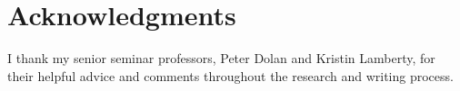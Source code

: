 \documentclass{sig-alternate}
\begin{document}
\section*{Acknowledgments}
\label{sec:acknowledgments}

I thank my senior seminar professors, Peter Dolan and Kristin Lamberty, 
for their helpful advice and comments throughout the research and writing process.



  
\end{document}
